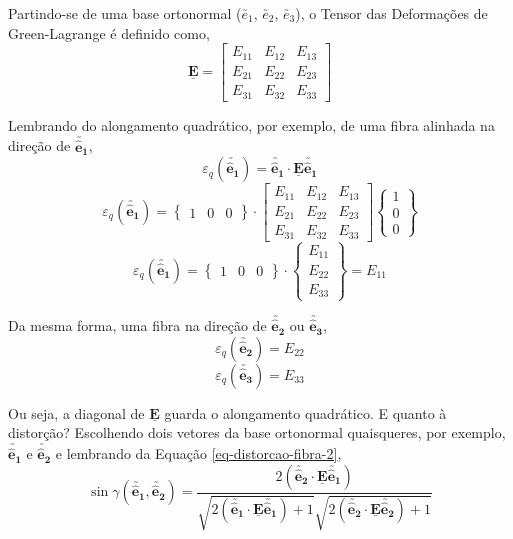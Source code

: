 Partindo-se de uma base ortonormal ($\utilde{e_1}$, $\utilde{e_2}$, $\utilde{e_3}$), o Tensor das Deformações de Green-Lagrange é definido como,
\[
	\underline{\mathbf{E}}
	=
	\begin{bmatrix}
		E_{11} & E_{12} & E_{13} \\
		E_{21} & E_{22} & E_{23} \\
		E_{31} & E_{32} & E_{33}
	\end{bmatrix}
\]

Lembrando do alongamento quadrático, por exemplo, de uma fibra alinhada na direção de $\utilde{\mathbf{\hat{e}_1}}$,
\[\varepsilon_q(\utilde{\mathbf{\hat{e}_1}})=\utilde{\mathbf{\hat{e}_1}}\cdot\underline{\mathbf{E}}\utilde{\mathbf{\hat{e}_1}}\]
\[
	\varepsilon_q(\utilde{\mathbf{\hat{e}_1}})
	=
	\begin{Bmatrix}
		1 & 0 & 0
	\end{Bmatrix}
	\cdot
	\begin{bmatrix}
		E_{11} & E_{12} & E_{13} \\
		E_{21} & E_{22} & E_{23} \\
		E_{31} & E_{32} & E_{33}
	\end{bmatrix}
	\begin{Bmatrix}
		1 \\ 0 \\ 0
	\end{Bmatrix}
\]
\[
	\varepsilon_q(\utilde{\mathbf{\hat{e}_1}})
	=
	\begin{Bmatrix}
		1 & 0 & 0
	\end{Bmatrix}
	\cdot
	\begin{Bmatrix}
		E_{11} \\ E_{22} \\ E_{33}
	\end{Bmatrix}
	=
	E_{11}
\]

Da mesma forma, uma fibra na direção de $\utilde{\mathbf{\hat{e}_2}}$ ou $\utilde{\mathbf{\hat{e}_3}}$,
\[\varepsilon_q(\utilde{\mathbf{\hat{e}_2}})=E_{22}\]
\[\varepsilon_q(\utilde{\mathbf{\hat{e}_3}})=E_{33}\]

Ou seja, a diagonal de $\underline{\mathbf{E}}$ guarda o alongamento quadrático. E quanto à distorção? Escolhendo dois vetores da base ortonormal quaisqueres, por exemplo, $\utilde{\mathbf{\hat{e}_1}}$ e $\utilde{\mathbf{\hat{e}_2}}$ e lembrando da Equação \eqref{eq-distorcao-fibra-2},
\begin{equation}\label{eq-distorcao-fibra-3}
    \sin\gamma(\utilde{\mathbf{\hat{e}_1}},\utilde{\mathbf{\hat{e}_2}})=\frac{2(\utilde{\mathbf{\hat{e}_2}}\cdot\underline{\mathbf{E}}\utilde{\mathbf{\hat{e}_1}})}{\displaystyle\sqrt{2(\utilde{\mathbf{\hat{e}_1}}\cdot\underline{\mathbf{E}}\utilde{\mathbf{\hat{e}_1}})+1}\sqrt{2(\utilde{\mathbf{\hat{e}_2}}\cdot\underline{\mathbf{E}}\utilde{\mathbf{\hat{e}_2}})+1}}
\end{equation}


